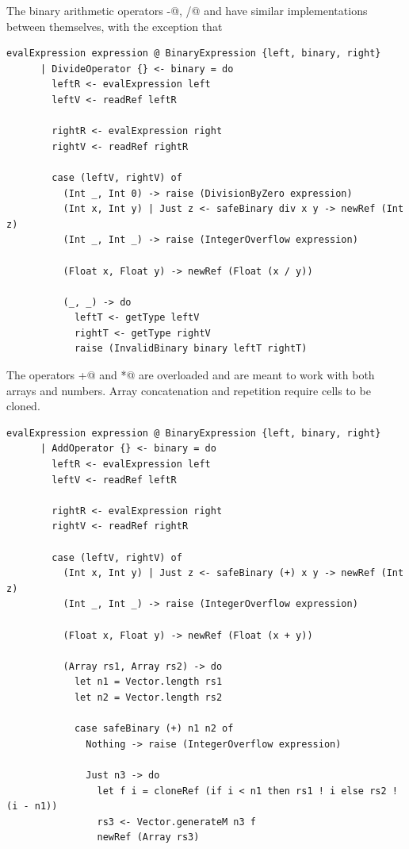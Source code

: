 \documentclass[UdineBachThesis,american,11pt]{PhdThesis}
\begin{document}
  \newpage

  The binary arithmetic operators \lstinline@-@, \lstinline@/@ and \lstinline@%@
  have similar implementations between themselves, with the exception that
  \lstinline@%@ supports only \lstinline@Int@s, and that both \lstinline@/@ and
  \lstinline@%@ raise an exception if the dividend is 0.

  \begin{lstlisting}[gobble=4,basicstyle=\ttfamily\small]
    evalExpression expression @ BinaryExpression {left, binary, right}
      | DivideOperator {} <- binary = do
        leftR <- evalExpression left
        leftV <- readRef leftR

        rightR <- evalExpression right
        rightV <- readRef rightR

        case (leftV, rightV) of
          (Int _, Int 0) -> raise (DivisionByZero expression)
          (Int x, Int y) | Just z <- safeBinary div x y -> newRef (Int z)
          (Int _, Int _) -> raise (IntegerOverflow expression)

          (Float x, Float y) -> newRef (Float (x / y))

          (_, _) -> do
            leftT <- getType leftV
            rightT <- getType rightV
            raise (InvalidBinary binary leftT rightT)
  \end{lstlisting}

  The operators \lstinline@+@ and \lstinline@*@ are overloaded and are meant to
  work with both arrays and numbers. Array concatenation and repetition require
  cells to be cloned.

  \begin{lstlisting}[gobble=4,basicstyle=\ttfamily\small]
    evalExpression expression @ BinaryExpression {left, binary, right}
      | AddOperator {} <- binary = do
        leftR <- evalExpression left
        leftV <- readRef leftR

        rightR <- evalExpression right
        rightV <- readRef rightR

        case (leftV, rightV) of
          (Int x, Int y) | Just z <- safeBinary (+) x y -> newRef (Int z)
          (Int _, Int _) -> raise (IntegerOverflow expression)

          (Float x, Float y) -> newRef (Float (x + y))

          (Array rs1, Array rs2) -> do
            let n1 = Vector.length rs1
            let n2 = Vector.length rs2

            case safeBinary (+) n1 n2 of
              Nothing -> raise (IntegerOverflow expression)

              Just n3 -> do
                let f i = cloneRef (if i < n1 then rs1 ! i else rs2 ! (i - n1))
                rs3 <- Vector.generateM n3 f
                newRef (Array rs3)
  \end{lstlisting}
\end{document}
